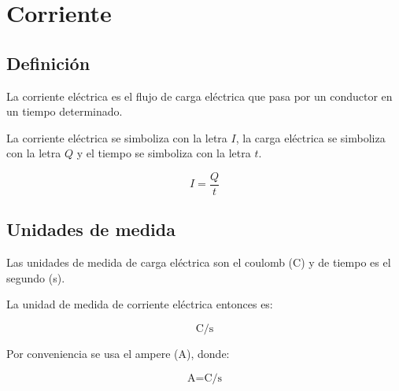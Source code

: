 \documentclass[../principal.tex]{subfiles}
\begin{document}
\chapter{Corriente}

\section{Definición}

La corriente eléctrica es el flujo de carga eléctrica que pasa por un conductor en un tiempo determinado.

La corriente eléctrica se simboliza con la letra $I$, la carga eléctrica se simboliza con la letra $Q$ y el tiempo se simboliza con la letra $t$.

\begin{equation}
    I = \frac{Q}{t}
\end{equation}



\section{Unidades de medida}

Las unidades de medida de carga eléctrica son el coulomb (\unit{\coulomb}) y de tiempo es el segundo (\unit{\second}).

La unidad de medida de corriente eléctrica entonces es:

\begin{equation}
    \unit{\coulomb\per\second}
\end{equation}

Por conveniencia se usa el ampere (\unit{\ampere}), donde:

\begin{equation}
    \unit{\ampere} = \unit{\coulomb\per\second}
\end{equation}
\end{document}
